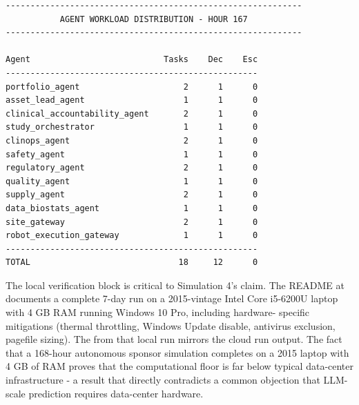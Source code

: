 \begin{verbatim}
------------------------------------------------------------
           AGENT WORKLOAD DISTRIBUTION - HOUR 167
------------------------------------------------------------

Agent                           Tasks    Dec    Esc
---------------------------------------------------
portfolio_agent                     2      1      0
asset_lead_agent                    1      1      0
clinical_accountability_agent       2      1      0
study_orchestrator                  1      1      0
clinops_agent                       2      1      0
safety_agent                        1      1      0
regulatory_agent                    2      1      0
quality_agent                       1      1      0
supply_agent                        2      1      0
data_biostats_agent                 1      1      0
site_gateway                        2      1      0
robot_execution_gateway             1      1      0
---------------------------------------------------
TOTAL                              18     12      0
\end{verbatim}

The local verification block is critical to Simulation 4's claim. The
README at
documents a complete 7-day run on a 2015-vintage Intel Core i5-6200U
laptop with 4 GB RAM running Windows 10 Pro, including hardware-
specific mitigations (thermal throttling, Windows Update disable,
antivirus exclusion, pagefile sizing). The
 from that local run mirrors the
cloud run output. The fact that a 168-hour autonomous sponsor
simulation completes on a 2015 laptop with 4 GB of RAM proves that
the computational floor is far below typical data-center
infrastructure - a result that directly contradicts a common
objection that LLM-scale prediction requires data-center hardware.

